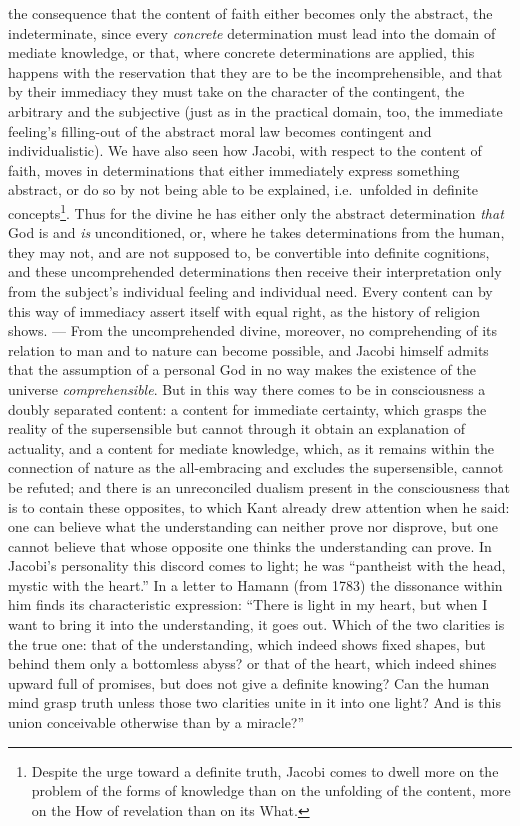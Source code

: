the consequence that the content of faith either becomes only the
abstract, the indeterminate, since every \emph{concrete} determination
must lead into the domain of mediate knowledge, or that, where concrete
determinations are applied, this happens with the reservation that
they are to be the incomprehensible, and that by their immediacy they
must take on the character of the contingent, the arbitrary and the
subjective (just as in the practical domain, too, the immediate
feeling's filling-out of the abstract moral law becomes contingent and
individualistic). We have also seen how Jacobi, with respect to the
content of faith, moves in determinations that either immediately
express something abstract, or do so by not being able to be
explained, i.e.\ unfolded in definite concepts\footnote{Despite the
  urge toward a definite truth, Jacobi comes to dwell more on the
  problem of the forms of knowledge than on the unfolding of the
  content, more on the How of revelation than on its What.}. Thus for
the divine he has either only the abstract determination
\emph{that} God is and \emph{is} unconditioned, or, where he takes
determinations from the human, they may not, and are not supposed to,
be convertible into definite cognitions, and these uncomprehended
determinations then receive their interpretation only from the
subject's individual feeling and individual need. Every content can by
this way of immediacy assert itself with equal right, as the history of
religion shows. --- From the uncomprehended divine, moreover, no
comprehending of its relation to man and to nature can become
possible, and Jacobi himself admits that the assumption of a personal
God in no way makes the existence of the universe
\emph{comprehensible}. But in this way there comes to be in
consciousness a doubly separated content: a content for immediate
certainty, which grasps the reality of the supersensible but cannot
through it obtain an explanation of actuality, and a content for
mediate knowledge, which, as it remains within the connection of
nature as the all-embracing and excludes the supersensible, cannot be
refuted; and there is an unreconciled dualism present in the
consciousness that is to contain these opposites, to which Kant already
drew attention when he said: one can believe what the understanding
can neither prove nor disprove, but one cannot believe that whose
opposite one thinks the understanding can prove. In Jacobi's
personality this discord comes to light; he was ``pantheist with the
head, mystic with the heart.''
In a letter to Hamann (from 1783) the dissonance within him finds its
characteristic expression: ``There is light in my heart, but when I
want to bring it into the understanding, it goes out. Which of the two
clarities is the true one: that of the understanding, which indeed
shows fixed shapes, but behind them only a bottomless abyss? or that of
the heart, which indeed shines upward full of promises, but does not
give a definite knowing? Can the human mind grasp truth unless those
two clarities unite in it into one light? And is this union
conceivable otherwise than by a miracle?''

